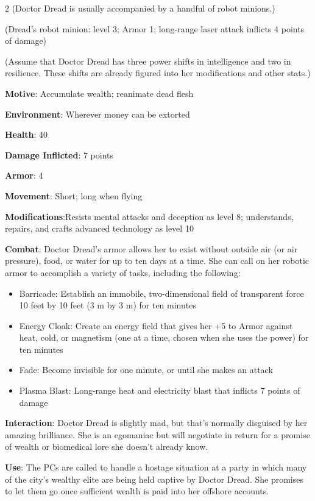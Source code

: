 \begin{multicols}{2}
(Doctor Dread is usually accompanied by a handful of robot minions.)

(Dread’s robot minion: level 3; Armor 1; long-range laser attack inflicts 4 points of damage)

(Assume that Doctor Dread has three power shifts in intelligence and two in resilience. These shifts are already figured into her modifications and other stats.)

\textbf{Motive}: Accumulate wealth; reanimate dead flesh

\textbf{Environment}: Wherever money can be extorted

\textbf{Health}: 40

\textbf{Damage Inflicted}: 7 points

\textbf{Armor}: 4

\textbf{Movement}: Short; long when flying

\textbf{Modifications}:Resists mental attacks and deception as level 8; understands, repairs, and crafts advanced technology as level 10

\textbf{Combat}: Doctor Dread’s armor allows her to exist without outside air (or air pressure), food, or water for up to ten days at a time. She can call on her robotic armor to accomplish a variety of tasks, including the following:

\begin{itemize} 
\item Barricade: Establish an immobile, two-dimensional field of transparent force 10 feet by 10 feet (3 m by 3 m) for ten minutes

\item Energy Cloak: Create an energy field that gives her +5 to Armor against heat, cold, or magnetism (one at a time, chosen when she uses the power) for ten minutes

\item Fade: Become invisible for one minute, or until she makes an attack

\item Plasma Blast: Long-range heat and electricity blast that inflicts 7 points of damage
\end{itemize}

\textbf{Interaction}: Doctor Dread is slightly mad, but that’s normally disguised by her amazing brilliance. She is an egomaniac but will negotiate in return for a promise of wealth or biomedical lore she doesn’t already know.

\textbf{Use}: The PCs are called to handle a hostage situation at a party in which many of the city’s wealthy elite are being held captive by Doctor Dread. She promises to let them go once sufficient wealth is paid into her offshore accounts.


\end{multicols}
